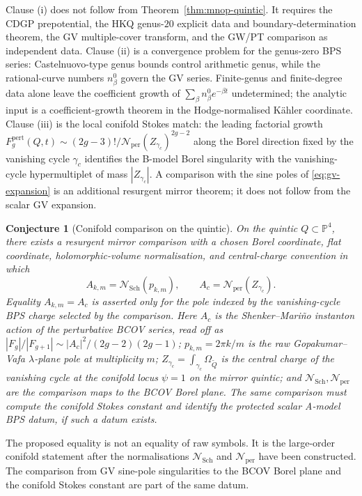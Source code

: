 \documentclass[12pt]{amsart}
\newtheorem{conj}[thm]{Conjecture}
\theoremstyle{remark}
\renewcommand{\P}{\mathbb{P}}
\begin{document}
Clause (i) does not follow from Theorem~\ref{thm:mnop-quintic}.  It
  requires the CDGP prepotential, the HKQ genus-\(20\) explicit data and
  boundary-determination theorem, the GV
multiple-cover transform, and the GW/PT comparison as independent
data.  Clause (ii) is a convergence problem
for the genus-zero BPS series: Castelnuovo-type genus bounds control
arithmetic genus, while the rational-curve numbers \(n_\beta^0\) govern
the GV series.  Finite-genus and finite-degree data alone leave the
coefficient growth of
\(\sum_\beta n_\beta^0 e^{-\beta t}\) undetermined; the analytic input
is a coefficient-growth theorem in the Hodge-normalised K\"ahler
coordinate.  Clause (iii) is the local
conifold Stokes match: the leading factorial growth
\(F_g^{\mathrm{pert}}(Q,t)\sim
(2g-3)!/\mathcal N_{\mathrm{per}}(Z_{\gamma_c})^{2g-2}\) along
the Borel direction fixed by the vanishing cycle \(\gamma_c\)
identifies the B-model Borel singularity with the vanishing-cycle
hypermultiplet of mass \(|Z_{\gamma_c}|\).  A comparison with the sine poles of
\eqref{eq:gv-expansion} is an additional resurgent mirror theorem; it
does not follow from the scalar GV expansion.

\begin{conj}[Conifold comparison on the quintic]
  \label{conj:conifold-trinity-quintic}
  On the quintic $Q \subset \P^4$, there exists a resurgent mirror
  comparison with a chosen Borel coordinate, flat coordinate,
  holomorphic-volume normalisation, and central-charge convention in which
  \[
    A_{k,m}
    =
    \mathcal N_{\mathrm{Sch}}(p_{k,m}),\qquad
    A_c=\mathcal N_{\mathrm{per}}(Z_{\gamma_c}).
  \]
  Equality \(A_{k,m}=A_c\) is asserted only for the pole indexed by the
  vanishing-cycle BPS charge selected by the comparison.  Here
  \(A_c\) is the Shenker--Mari\~no instanton action
  of the perturbative BCOV series, read off as
  \(|F_g|/|F_{g+1}|\sim|A_c|^2/(2g-2)(2g-1)\);
  \(p_{k,m}=2\pi k/m\) is the raw Gopakumar--Vafa \(\lambda\)-plane pole
  at multiplicity \(m\);
  \(Z_{\gamma_c}=\int_{\gamma_c}\Omega_{\widetilde Q}\) is the
  central charge of the vanishing cycle at the conifold locus
  \(\psi=1\) on the mirror quintic; and
  \(\mathcal N_{\mathrm{Sch}},\mathcal N_{\mathrm{per}}\) are the
  comparison maps to the BCOV Borel plane.  The same comparison must
  compute the conifold Stokes constant and identify the protected scalar
  A-model BPS datum, if such a datum exists.
\end{conj}

The proposed equality is not an equality of raw symbols.  It is the
large-order conifold statement after the normalisations
\(\mathcal N_{\mathrm{Sch}}\) and \(\mathcal N_{\mathrm{per}}\) have
been constructed.  The comparison from GV sine-pole singularities to the
BCOV Borel plane and the conifold Stokes constant are part of the same
datum.
\end{document}
